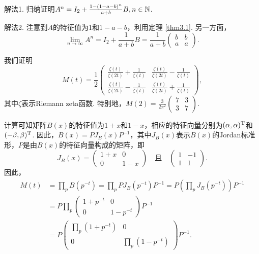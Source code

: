 \begin{solution}
  {\kaishu 解法1.} 归纳证明$A^n=I_2+\frac{1-(1-a-b)^n}{a+b}B,n\in\mathbb N$.

  {\kaishu 解法2.} 注意到$A$的特征值为1和$1-a-b$，利用定理 \ref{thm3.1}. 另一方面，
  \[
    \lim_{n\to\infty} A^n = I_2 + \frac1{a+b}B = \frac1{a+b} \begin{pmatrix}
      b & b \\
      a & a
    \end{pmatrix}.
  \]
\end{solution}

\begin{solution}
  我们证明
  \[
    M(t) = \frac12 \begin{pmatrix}
      \frac{\zeta(t)}{\zeta(2t)} + \frac1{\zeta(t)} & \frac{\zeta(t)}{\zeta(2t)} - \frac1{\zeta(t)} \\
      \frac{\zeta(t)}{\zeta(2t)} - \frac1{\zeta(t)} & \frac{\zeta(t)}{\zeta(2t)} + \frac1{\zeta(t)}
    \end{pmatrix},
  \]
  其中$\zeta$表示Riemann zeta函数. 特别地，$M(2)=\frac3{2\pi^2}\begin{pmatrix}
    7 & 3 \\
    3 & 7
  \end{pmatrix}$.

  计算可知矩阵$B(x)$的特征值为$1+x$和$1-x$，相应的特征向量分别为$(\alpha,\alpha)^{\mathrm T}$和$(-\beta,\beta)^{\mathrm T}$. 因此，$B(x)=PJ_B(x)P^{-1}$，其中$J_B(x)$表示$B(x)$的Jordan标准形，$P$是由$B(x)$的特征向量构成的矩阵，即
  \[
    J_B(x) = \begin{pmatrix}
      1 + x & 0 \\
      0 & 1 - x
    \end{pmatrix}\quad \text{且}\quad
    \begin{pmatrix}
      1 & -1 \\
      1 & 1
    \end{pmatrix}.
  \]
  因此，
  \begin{align*}
    M(t) & = \prod_p B(p^{-t}) = \prod_pPJ_B(p^{-t})P^{-1} = P \left( \prod_pJ_B(p^{-t}) \right) P^{-1} \\
    & = P \prod_p\begin{pmatrix}
      1 + p^{-t} & 0 \\
      0 & 1 - p^{-t}
    \end{pmatrix} P^{-1} \\
    & = P \begin{pmatrix}
      \prod_p(1+p^{-t}) & 0 \\
      0 & \prod_p(1-p^{-t})
    \end{pmatrix} P^{-1}.
  \end{align*}


\end{solution}
